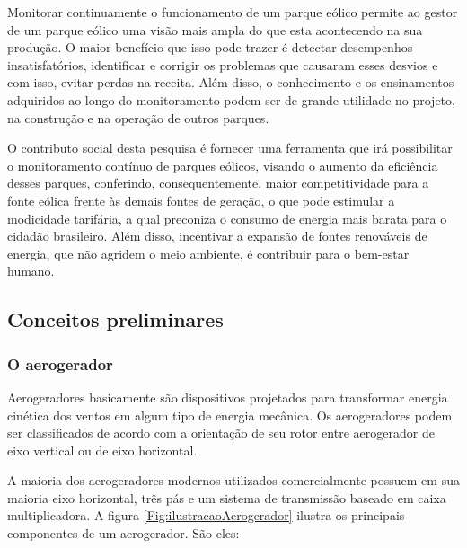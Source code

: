 Monitorar continuamente o funcionamento de um parque eólico permite ao gestor de um parque eólico uma visão mais ampla do que esta acontecendo na sua produção. O maior benefício que isso pode trazer é detectar desempenhos insatisfatórios, identificar e corrigir os problemas que causaram esses desvios e com isso, evitar perdas na receita. Além disso, o conhecimento e os ensinamentos adquiridos ao longo do monitoramento podem ser de grande utilidade no projeto, na construção e na operação de outros parques.

O contributo social desta pesquisa é fornecer uma ferramenta que irá possibilitar o monitoramento contínuo de parques eólicos, visando o aumento da eficiência desses parques, conferindo, consequentemente, maior competitividade para a fonte eólica frente às demais fontes de geração, o que pode estimular a modicidade tarifária, a qual preconiza o consumo de energia mais barata para o cidadão brasileiro. Além disso, incentivar a expansão de fontes renováveis de energia, que não agridem o meio ambiente, é contribuir para o bem-estar humano.


\subsection{Conceitos preliminares}
\label{Sec:conceitosPreliminares}

\subsubsection{O aerogerador}
\label{Sec:oAerogerador}

Aerogeradores basicamente são dispositivos projetados para transformar energia cinética dos ventos em algum tipo de energia mecânica. Os aerogeradores podem ser classificados de acordo com a orientação de seu rotor entre aerogerador de eixo vertical ou de eixo horizontal.

A maioria dos aerogeradores modernos utilizados comercialmente possuem em sua maioria eixo horizontal, três pás e um sistema de transmissão baseado em caixa multiplicadora. A figura \ref{Fig:ilustracaoAerogerador} ilustra os principais componentes de um aerogerador. São eles:

